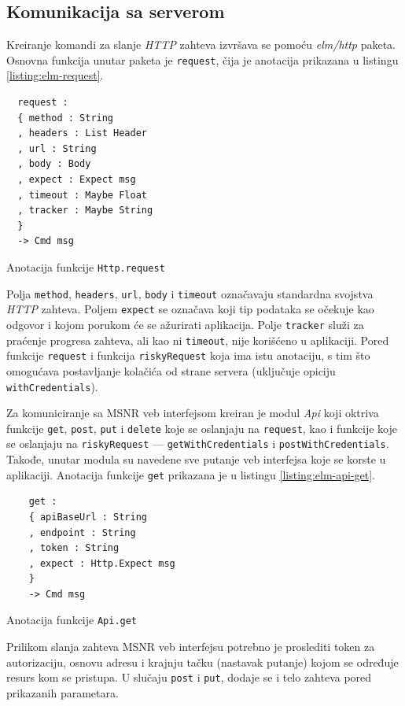 \documentclass[12pt,oneside]{memoir}
\begin{document}
\subsection{Komunikacija sa serverom}
Kreiranje komandi za slanje \emph{HTTP} zahteva izvršava se pomoću \emph{elm/http} paketa.
Osnovna funkcija unutar paketa je \texttt{request}, čija je anotacija prikazana u listingu \ref{listing:elm-request}.
\begin{listing}[h]
\begin{verbatim}
  request :
  { method : String
  , headers : List Header
  , url : String
  , body : Body
  , expect : Expect msg
  , timeout : Maybe Float
  , tracker : Maybe String
  }
  -> Cmd msg
\end{verbatim}
\caption{Anotacija funkcije \texttt{Http.request}}
\label{listing:elm-request}
\end{listing}

Polja \texttt{method}, \texttt{headers}, \texttt{url}, \texttt{body} i \texttt{timeout} označavaju standardna
svojstva \emph{HTTP} zahteva. Poljem \texttt{expect} se označava koji tip podataka se očekuje kao odgovor i kojom porukom
će se ažurirati aplikacija. Polje \texttt{tracker} služi za praćenje progresa zahteva, ali kao ni \texttt{timeout},
nije korišćeno u aplikaciji. Pored funkcije \texttt{request} i funkcija \texttt{riskyRequest} koja ima istu anotaciju, s tim što omogućava
postavljanje kolačića od strane servera (uključuje opiciju \texttt{withCredentials}).

Za komuniciranje sa MSNR veb interfejsom kreiran je modul \emph{Api} koji oktriva funkcije \texttt{get}, \texttt{post},
\texttt{put} i \texttt{delete} koje se oslanjaju na \texttt{request}, kao i funkcije koje se oslanjaju na
\texttt{riskyRequest} --- \texttt{getWithCredentials} i \texttt{postWithCredentials}. Takođe, unutar modula
su navedene sve putanje veb interfejsa koje se korste u aplikaciji.
Anotacija funkcije \texttt{get} prikazana je u listingu \ref{listing:elm-api-get}. 
\begin{listing}[h]
  \begin{verbatim}
    get :
    { apiBaseUrl : String
    , endpoint : String
    , token : String
    , expect : Http.Expect msg
    }
    -> Cmd msg
  \end{verbatim}
  \caption{Anotacija funkcije \texttt{Api.get}}
  \label{listing:elm-api-get}
  \end{listing}
Prilikom slanja zahteva MSNR veb interfejsu potrebno je proslediti token za autorizaciju,
osnovu adresu i krajnju tačku (nastavak putanje) kojom se određuje resurs kom se pristupa.
U slučaju \texttt{post} i \texttt{put}, dodaje se i telo zahteva pored prikazanih parametara.
\end{document}
